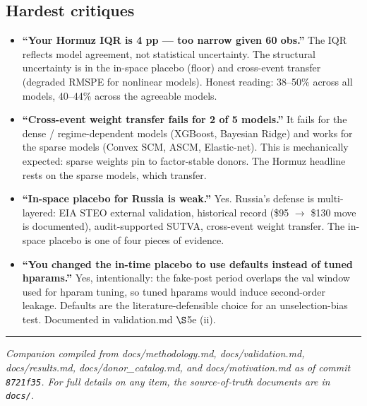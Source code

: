 \documentclass[11pt,a4paper]{article}
\begin{document}
\subsection{Hardest critiques}
\begin{itemize}
  \item \textbf{``Your Hormuz IQR is 4 pp --- too narrow given 60 obs.''} The IQR reflects model agreement, not statistical uncertainty. The structural uncertainty is in the in-space placebo (floor) and cross-event transfer (degraded RMSPE for nonlinear models). Honest reading: 38--50\% across all models, 40--44\% across the agreeable models.
  \item \textbf{``Cross-event weight transfer fails for 2 of 5 models.''} It fails for the dense / regime-dependent models (XGBoost, Bayesian Ridge) and works for the sparse models (Convex SCM, ASCM, Elastic-net). This is mechanically expected: sparse weights pin to factor-stable donors. The Hormuz headline rests on the sparse models, which transfer.
  \item \textbf{``In-space placebo for Russia is weak.''} Yes. Russia's defense is multi-layered: EIA STEO external validation, historical record (\$95 $\to$ \$130 move is documented), audit-supported SUTVA, cross-event weight transfer. The in-space placebo is one of four pieces of evidence.
  \item \textbf{``You changed the in-time placebo to use defaults instead of tuned hparams.''} Yes, intentionally: the fake-post period overlaps the val window used for hparam tuning, so tuned hparams would induce second-order leakage. Defaults are the literature-defensible choice for an unselection-bias test. Documented in validation.md $\S$5e (ii).
\end{itemize}

\vspace{2em}
\hrule
\vspace{0.5em}
\textcolor{muted}{\small\itshape Companion compiled from docs/methodology.md, docs/validation.md, docs/results.md, docs/donor\_catalog.md, and docs/motivation.md as of commit \texttt{8721f35}. For full details on any item, the source-of-truth documents are in \texttt{docs/}.}
\end{document}

